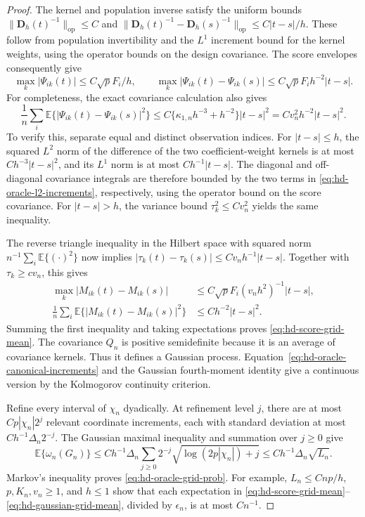\documentclass[12pt]{article}
\newcommand{\bD}{{\mathbf D}}
\newcommand{\expect}{\mathbb{E}}
\numberwithin{equation}{section}
\begin{document}
\begin{proof}
The kernel and population inverse satisfy the uniform bounds
$\|\bD_h(t)^{-1}\|_{\mathrm{op}}\le C$ and
$\|\bD_h(t)^{-1}-\bD_h(s)^{-1}\|_{\mathrm{op}}
 \le C|t-s|/h$.
These follow from population invertibility and the $L^1$ increment
bound for the kernel weights, using the operator bounds on the design
covariance. The score envelopes consequently give
\[
 \max_k|\Psi_{ik}(t)|\le C\sqrt pF_i/h,
 \qquad
 \max_k|\Psi_{ik}(t)-\Psi_{ik}(s)|
 \le C\sqrt pF_i h^{-2}|t-s|.
\]
For completeness, the exact covariance calculation also gives
\begin{equation}
 \frac1n\sum_i\expect\{|\Psi_{ik}(t)-\Psi_{ik}(s)|^2\}
 \le C\{\kappa_{1,n}h^{-3}+h^{-2}\}|t-s|^2
 =Cv_n^2h^{-2}|t-s|^2.
 \label{eq:hd-oracle-l2-increments}
\end{equation}
To verify this, separate equal and distinct observation indices. For
$|t-s|\le h$, the squared $L^2$ norm of the difference of the two
coefficient-weight kernels is at most $Ch^{-3}|t-s|^2$, and its
$L^1$ norm is at most $Ch^{-1}|t-s|$. The diagonal and off-diagonal
covariance integrals are therefore bounded by the two terms in
\eqref{eq:hd-oracle-l2-increments}, respectively, using the operator
bound on the score covariance. For $|t-s|>h$, the variance bound
$\tau_k^2\le Cv_n^2$ yields the same inequality.

The reverse triangle inequality in the Hilbert space with squared norm
$n^{-1}\sum_i\expect\{(\cdot)^2\}$ now implies
$|\tau_k(t)-\tau_k(s)|\le Cv_nh^{-1}|t-s|$.
Together with $\tau_k\ge cv_n$, this gives
\begin{align}
 \max_k|M_{ik}(t)-M_{ik}(s)|
 &\le C\sqrt pF_i(v_nh^2)^{-1}|t-s|,
 \label{eq:hd-oracle-path-increments}\\
 \frac1n\sum_i\expect\{|M_{ik}(t)-M_{ik}(s)|^2\}
 &\le Ch^{-2}|t-s|^2.
 \label{eq:hd-oracle-canonical-increments}
\end{align}
Summing the first inequality and taking expectations proves
\eqref{eq:hd-score-grid-mean}. The covariance $Q_n$ is positive
semidefinite because it is an average of covariance kernels. Thus it
defines a Gaussian process. Equation~\eqref{eq:hd-oracle-canonical-increments}
and the Gaussian fourth-moment identity give a continuous version by
the Kolmogorov continuity criterion.

Refine every interval of $\chi_n$ dyadically. At refinement level $j$,
there are at most $Cp|\chi_n|2^j$ relevant coordinate increments, each
with standard deviation at most $Ch^{-1}\Delta_n2^{-j}$.
The Gaussian maximal inequality and summation over $j\ge0$ give
\[
 \expect\{\omega_n(G_n)\}
 \le Ch^{-1}\Delta_n\sum_{j\ge0}2^{-j}
       \sqrt{\log(2p|\chi_n|)+j}
 \le Ch^{-1}\Delta_n\sqrt{L_n}.
\]
Markov's inequality proves \eqref{eq:hd-oracle-grid-prob}.
For example, $L_n\le Cnp/h$, $p,K_n,v_n\ge1$, and $h\le1$ show
that each expectation in
\eqref{eq:hd-score-grid-mean}--\eqref{eq:hd-gaussian-grid-mean},
divided by $\epsilon_n$, is at most $Cn^{-1}$.
\end{proof}
\end{document}
